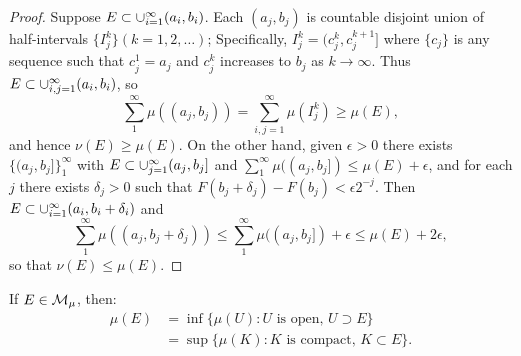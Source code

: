 \begin{proof}
    Suppose $E\subset\cup_{i=1}^{\infty}(a_i,b_i)$. Each $(a_j,b_j)$ is
    countable disjoint union of half-intervals $\{I_j^k\}(k=1,2,\ldots)$;
    Specifically, $I_j^k=(c_j^k,c_j^{k+1}]$ where $\{c_j\}$ is any sequence
    such that $c_j^1=a_j$ and $c_j^k$ increases to $b_j$ as $k\rightarrow\infty$.
    Thus $E\subset\cup_{i,j=1}^{\infty}(a_i,b_i)$, so
    \begin{displaymath}
        \sum_{1}^{\infty}\mu((a_j,b_j))=\sum_{i,j=1}^{\infty}\mu(I_j^k)\geq\mu(E),
    \end{displaymath}
    and hence $\nu(E)\geq\mu(E)$. On the other hand, given $\epsilon>0$ there
    exists $\{(a_j,b_j]\}_{1}^{\infty}$ with $E\subset\cup_{j=1}^{\infty}(a_j,b_j]$
    and $\sum_1^{\infty}\mu((a_j,b_j])\leq\mu(E)+\epsilon$, and for each $j$
    there exists $\delta_j>0$ such that $F(b_j+\delta_j)-F(b_j)<\epsilon2^{-j}$.
    Then $E\subset\cup_{i=1}^{\infty}(a_i,b_i+\delta_i)$ and
    \begin{displaymath}
        \sum_{1}^{\infty}\mu((a_j,b_j+\delta_j))\leq\sum_{1}^{\infty}\mu((a_j,b_j])+\epsilon\leq\mu(E)+2\epsilon,
    \end{displaymath}
    so that $\nu(E)\leq\mu(E)$. 
\end{proof}
\begin{thm}
    \label{Thm:ApproxMeasurableSet}
    If $E\in\mathcal{M}_{\mu}$, then:
    \begin{displaymath}
        \begin{array}{rl}
        \mu(E)&=\inf\{\mu(U):U\text{ is open, }U\supset E\}\\
        &=\sup\{\mu(K):K\text{ is compact, }K\subset E\}.
        \end{array}
    \end{displaymath}
\end{thm}
